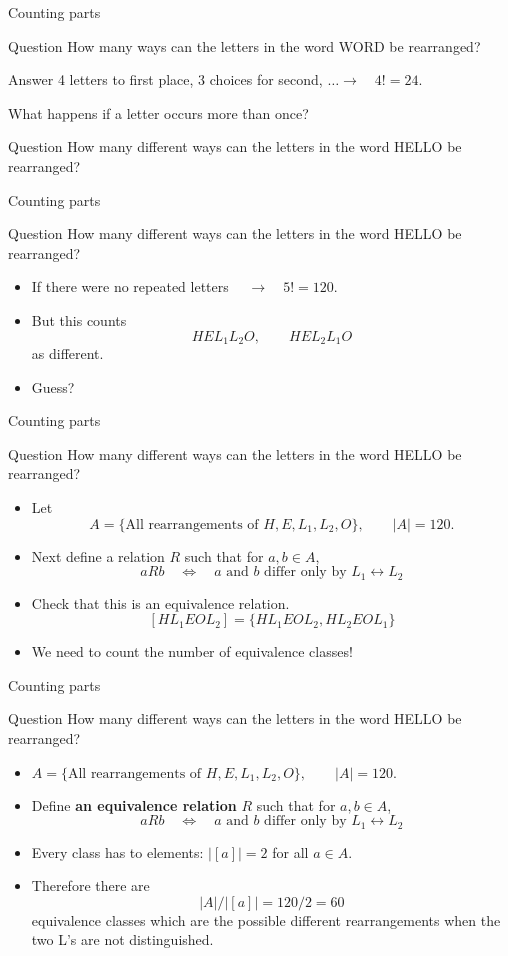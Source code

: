 \documentclass{beamer}
\def\bl[#1]#2{\begin{block}{#1}#2\end{block}}
\def\itemb{\begin{itemize}}
\def\iteme{\end{itemize}}
\begin{document}
\begin{frame}{Counting parts}
\bl[Question]{
How many ways can the letters in the word WORD be rearranged?
}

\bl[Answer]{
4 letters to first place, 3 choices for second, $\dots \to\quad4!=24$.}
What happens if a letter occurs more than once?

\bl[Question]{
How many different ways can the letters in the word HELLO be rearranged?
}

\end{frame}

\begin{frame}{Counting parts}
\bl[Question]{
How many different ways can the letters in the word HELLO be rearranged?
}
\itemb
\item If there were no repeated letters $\quad\to\quad 5!=120$.
\item But this counts
\[
HEL_1L_2O,\qquad HEL_2L_1O
\]
as different.
\item Guess?
\iteme

\end{frame}

\begin{frame}{Counting parts}
\bl[Question]{
How many different ways can the letters in the word HELLO be rearranged?
}
\itemb
\item Let
\[
A=\{\textrm{All rearrangements of }  H,E,L_1,L_2,O\},\qquad |A|=120.
\]
\item Next define a relation $R$ such that for $a,b\in A$,
\[
aRb\quad\Leftrightarrow\quad \textrm{$a$ and $b$ differ only by $L_1\leftrightarrow L_2$}
\]
\item Check that this is an equivalence relation.
\[
[HL_1EOL_2]=\{HL_1EOL_2,HL_2EOL_1\}
\]
\item We need to count the number of equivalence classes!
\iteme
\end{frame}

\begin{frame}{Counting parts}
\bl[Question]{
How many different ways can the letters in the word HELLO be rearranged?
}
\itemb
\item $A=\{\textrm{All rearrangements of }  H,E,L_1,L_2,O\},\qquad |A|=120.$
\item Define \textbf{an equivalence relation} $R$ such that for $a,b\in A$,
\[
aRb\quad\Leftrightarrow\quad \textrm{$a$ and $b$ differ only by $L_1\leftrightarrow L_2$}
\]
\item Every class has to elements: $|[a]|=2$ for all $a\in A$.
\item Therefore there are 
\[
|A|/|[a]|=120/2=60
\]
equivalence classes which are the possible different rearrangements when the two L's are not distinguished.
\iteme
\end{frame}
\end{document}

